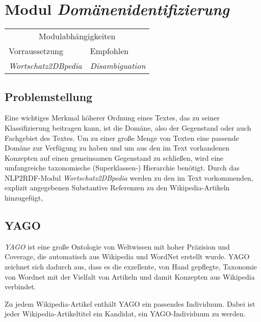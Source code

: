 \section{Modul \textit{Domänenidentifizierung}}
\begin{center}
\begin{tabular}{l|l}
\multicolumn{2}{c}{Modulabhängigkeiten}\\
Vorraussetzung& Empfohlen\\
\hline
\textit{Wortschatz2DBpedia} & \textit{Disambiguation}
\end{tabular}

\end{center}

\subsection{Problemstellung}
Eine wichtiges Merkmal höherer Ordnung eines Textes, das zu seiner Klassifizierung beitragen kann, ist die Domäne, also der Gegenstand oder auch Fachgebiet des Textes.
Um zu einer große Menge von Texten eine passende Domäne zur Verfügung zu haben und um aus den im Text vorhandenen Konzepten auf einen gemeinsamen Gegenstand zu schließen, wird eine
umfangreiche taxonomische (Superklassen-) Hierarchie benötigt.
 Durch das NLP2RDF-Modul \textit{Wortschatz2DBpedia} werden zu den im Text vorkommenden, explizit angegebenen Substantive\footnotemark 
{}
Referenzen zu den Wikipedia-Artikeln hinzugefügt, 
\subsection{YAGO}
\textit{YAGO}\cite{yago} ist eine große Ontologie von Weltwissen mit hoher Präzision und Coverage, die automatisch aus Wikipedia und WordNet erstellt wurde.
YAGO zeichnet sich dadurch aus, dass es die exzellente, von Hand gepflegte, Taxonomie von Wordnet mit der Vielfalt von Artikeln und damit Konzepten aus Wikipedia verbindet.

Zu jedem Wikipedia-Artikel enthält YAGO ein passendes Individuum. Dabei ist jeder Wikipedia-Artikeltitel ein Kandidat, ein YAGO-Individuum zu werden.

